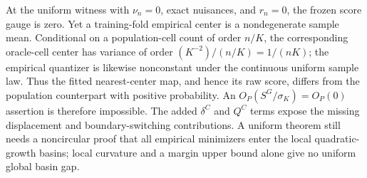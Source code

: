 At the uniform witness with \(\nu_n=0\), exact nuisances, and \(r_n=0\), the frozen score gauge is zero.  Yet a training-fold empirical center is a nondegenerate sample mean.  Conditional on a population-cell count of order \(n/K\), the corresponding oracle-cell center has variance of order \((K^{-2})/(n/K)=1/(nK)\); the empirical quantizer is likewise nonconstant under the continuous uniform sample law.  Thus the fitted nearest-center map, and hence its raw score, differs from the population counterpart with positive probability.  An \(O_P(S^G/\sigma_K)=O_P(0)\) assertion is therefore impossible.  The added \(\delta^C\) and \(Q^C\) terms expose the missing displacement and boundary-switching contributions.  A uniform theorem still needs a noncircular proof that all empirical minimizers enter the local quadratic-growth basins; local curvature and a margin upper bound alone give no uniform global basin gap.